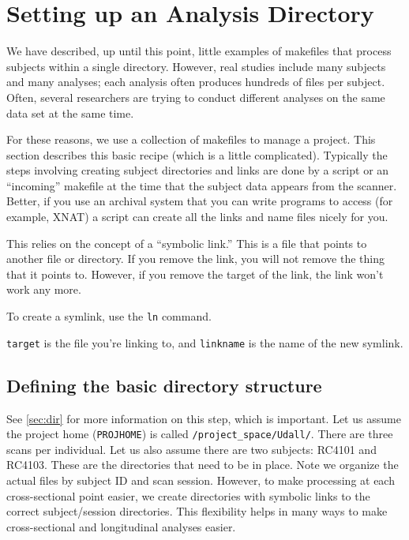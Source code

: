 \section{Setting up an Analysis Directory}
\label{sec:analysisdir}

We have described, up until this point, little examples of makefiles that process subjects within a single directory. However, real studies include many subjects and many analyses; each analysis often produces hundreds of files per subject. Often, several researchers are trying to conduct different analyses on the same data set at the same time.

For these reasons, we use a collection of makefiles to manage a project. This section describes this basic recipe (which is a little complicated). Typically the steps involving creating subject directories and links are done by a script or an ``incoming'' makefile at the time that the subject data appears from the scanner. Better, if you use an archival system that you can write programs to access (for example, XNAT) a script can create all the links and name files nicely for you.

This relies on the concept of a ``symbolic link.'' This is a file that points to another file or directory. If you remove the link, you will not remove the thing that it points to. However, if you remove the target of the link, the link won't work any more.

To create a symlink, use the \texttt{ln} command.

\texttt{target} is the file you're linking to, and \texttt{linkname} is the name of the new symlink.

\subsection{Defining the basic directory structure}
See \autoref{sec:dir} for more information on this step, which is important. Let us assume the project home (\texttt{PROJHOME}) is called \texttt{/project_space/Udall/}. There are three scans per individual. Let us also assume there are two subjects: RC4101 and RC4103. These are the directories that need to be in place. Note we organize the actual files by subject ID and scan session. However, to make processing at each cross-sectional point easier, we create directories with symbolic links to the correct subject/session directories. This flexibility helps in many ways to make cross-sectional and longitudinal analyses easier.

